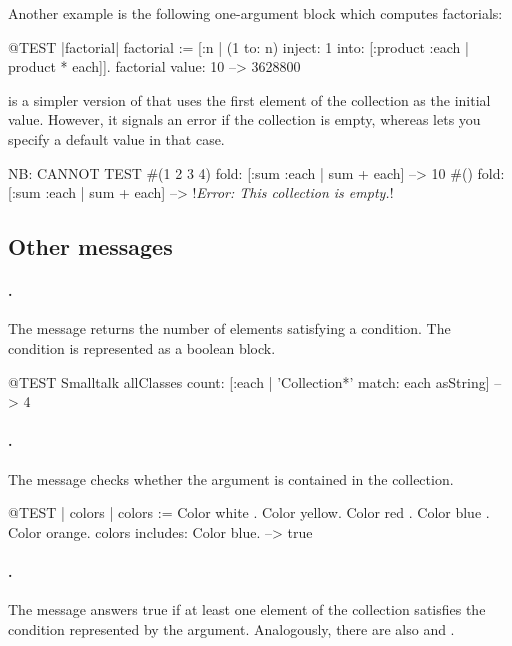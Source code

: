 \documentclass[a4paper,10pt,twoside]{book}
\begin{document}
Another example is the following one-argument block which computes factorials:
\begin{code}{@TEST |factorial|}
factorial := [:n | (1 to: n) inject: 1 into: [:product :each | product * each]].
factorial value: 10 --> 3628800
\end{code}

 is a simpler version of  that uses the first element of the collection as the initial value.
However, it signals an error if the collection is empty, whereas  lets you specify a default value in that case.

\begin{code}{NB: CANNOT TEST}
#(1 2 3 4) fold: [:sum :each | sum + each] --> 10
#() fold: [:sum :each | sum + each] --> !\emph{Error: This collection is empty.}!

\end{code}

\subsection{Other messages}

\paragraph{.}
The message  returns the number of elements satisfying a condition.
The condition is represented as a boolean block.

\begin{code}{@TEST}
Smalltalk allClasses count: [:each | 'Collection*' match: each asString] --> 4
\end{code}

\paragraph{.}
The message  checks whether the argument is contained in the collection.

\begin{code}{@TEST | colors |}
colors := {Color white . Color yellow. Color red . Color blue . Color orange}.
colors includes: Color blue. --> true
\end{code}

\paragraph{.}
The message  answers true if at least one element of the collection satisfies the condition represented by the argument.
Analogously, there are also  and .
\end{document}
